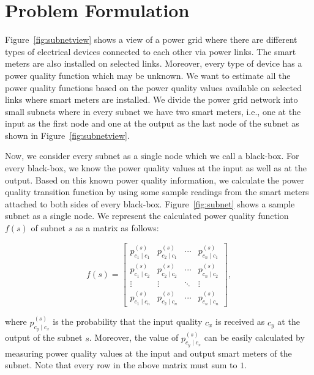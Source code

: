 \section{Problem Formulation}
Figure~\ref{fig:subnetview} shows a view of a power grid where there are different types of electrical devices connected to each other via power links. The smart meters are also installed on selected links. Moreover, every type of device has a power quality function which may be unknown. We want to estimate all the power quality functions based on the power quality values available on selected links where smart meters are installed. We divide the power grid network into small subnets where in every subnet we have two smart meters, i.e., one at the input as the first node and one at the output as the last node of the subnet as shown in Figure~\ref{fig:subnetview}.

Now, we consider every subnet as a single node which we call a black-box. For every black-box, we know the power quality values at the input as well as at the output. Based on this known power quality information, we calculate the power quality transition function by using some sample readings from the smart meters attached to both sides of every black-box. Figure~\ref{fig:subnet} shows a sample subnet as a single node. We represent the calculated power quality function $f(s)$  of subnet $s$ as a matrix as follows:

\vspace{1cm}
\begin{equation}
f(s) = \left[\begin{array}{cccc} p_{c_1 \mid c_1}^{(s)} & p_{c_2 \mid c_1}^{(s)} & \cdots & p_{c_n \mid c_1}^{(s)}\\
p_{c_1 \mid c_2}^{(s)} & p_{c_2 \mid c_2}^{(s)} & \cdots & p_{c_n \mid c_2}^{(s)}\\
\vdots & \vdots& \ddots & \vdots\\
p_{c_1 \mid c_n}^{(s)} & p_{c_2 \mid c_n}^{(s)} & \cdots & p_{c_n \mid c_n}^{(s)}
\end{array}\right],
\end{equation}
\vspace{1cm}

\noindent
where $p_{c_y  \mid c_x}^{(s)}$ is the probability that the input quality $c_x$ is received as $c_y$ at the output of the subnet $s$. Moreover, the value of $p_{c_y  \mid c_x}^{(s)}$ can be easily calculated by measuring power quality values at the input and output smart meters of the subnet. Note that every row in the above matrix must sum to $1$.

